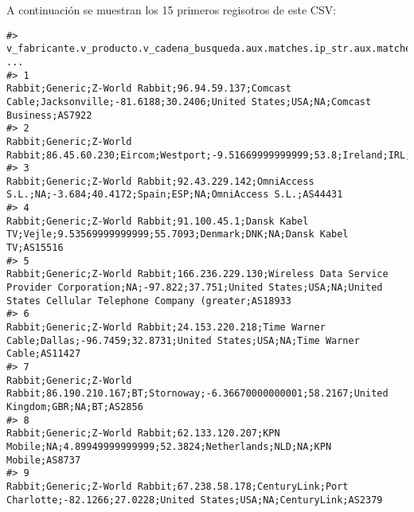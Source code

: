 \documentclass[]{article}
\begin{document}
A continuación se muestran los 15 primeros regisotros de este CSV:

\begin{verbatim}
#>    v_fabricante.v_producto.v_cadena_busqueda.aux.matches.ip_str.aux.matches.isp.aux.matches.location.city.aux.matches.location.longitude.aux.matches.location.latitude.aux.matches.location.country_name.aux.matches.location.country_code3.aux.matches.os.au ...
#> 1                                                                                                                             Rabbit;Generic;Z-World Rabbit;96.94.59.137;Comcast Cable;Jacksonville;-81.6188;30.2406;United States;USA;NA;Comcast Business;AS7922
#> 2                                                                                                                                                  Rabbit;Generic;Z-World Rabbit;86.45.60.230;Eircom;Westport;-9.51669999999999;53.8;Ireland;IRL;NA;Eircom;AS5466
#> 3                                                                                                                                              Rabbit;Generic;Z-World Rabbit;92.43.229.142;OmniAccess S.L.;NA;-3.684;40.4172;Spain;ESP;NA;OmniAccess S.L.;AS44431
#> 4                                                                                                                                   Rabbit;Generic;Z-World Rabbit;91.100.45.1;Dansk Kabel TV;Vejle;9.53569999999999;55.7093;Denmark;DNK;NA;Dansk Kabel TV;AS15516
#> 5                                                                       Rabbit;Generic;Z-World Rabbit;166.236.229.130;Wireless Data Service Provider Corporation;NA;-97.822;37.751;United States;USA;NA;United States Cellular Telephone Company (greater;AS18933
#> 6                                                                                                                           Rabbit;Generic;Z-World Rabbit;24.153.220.218;Time Warner Cable;Dallas;-96.7459;32.8731;United States;USA;NA;Time Warner Cable;AS11427
#> 7                                                                                                                                             Rabbit;Generic;Z-World Rabbit;86.190.210.167;BT;Stornoway;-6.36670000000001;58.2167;United Kingdom;GBR;NA;BT;AS2856
#> 8                                                                                                                                        Rabbit;Generic;Z-World Rabbit;62.133.120.207;KPN Mobile;NA;4.89949999999999;52.3824;Netherlands;NLD;NA;KPN Mobile;AS8737
#> 9                                                                                                                                 Rabbit;Generic;Z-World Rabbit;67.238.58.178;CenturyLink;Port Charlotte;-82.1266;27.0228;United States;USA;NA;CenturyLink;AS2379

\end{verbatim}
\end{document}
